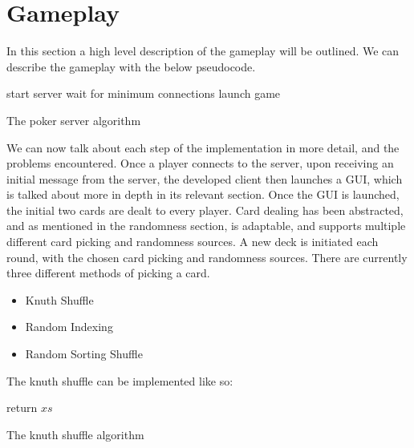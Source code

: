 \section{Gameplay}
In this section a high level description of the gameplay will be outlined.
We can describe the gameplay with the below pseudocode.

\vspace{0.3cm}

\begin{algorithm}[H]
    start server\;
    wait for minimum connections\;
    launch game\;
\caption{The poker server algorithm}%
\label{code:pokerServer}
\end{algorithm}

\vspace{0.3cm}

We can now talk about each step of the implementation in more detail, and the
problems encountered. Once a player connects to the server, upon receiving
an initial message from the server, the developed client then launches
a GUI, which is talked about more in depth in its relevant section. Once the
GUI is launched, the initial two cards are dealt to every player. Card dealing 
has been abstracted, and as mentioned in the randomness section, is adaptable, 
and supports multiple different card picking and randomness sources. A new deck
is initiated each round, with the chosen card picking and randomness sources. 
There are currently three different methods of picking a card.

\begin{itemize}
    \item Knuth Shuffle
    \item Random Indexing
    \item Random Sorting Shuffle
\end{itemize}

The knuth shuffle \parencite{knuth1997} can be implemented like so:

\vspace{0.3cm}

\begin{algorithm}[H]
    \BlankLine{}
    return $xs$\;
\caption{The knuth shuffle algorithm}
\end{algorithm}

